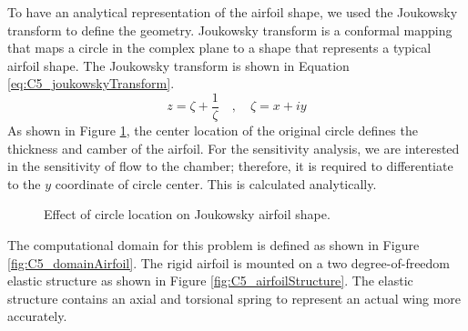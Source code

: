To have an analytical representation of the airfoil shape, we used the Joukowsky transform to define the geometry. Joukowsky transform is a conformal mapping that maps a circle in the complex plane to a shape that represents a typical airfoil shape. The Joukowsky transform is shown in Equation \eqref{eq:C5_joukowskyTransform}.
%
\begin{equation}\label{eq:C5_joukowskyTransform}
	z = \zeta + \frac{1}{\zeta} \quad , \quad \zeta = x + iy
\end{equation}
%
As shown in Figure \ref{fig:C5_joukowskyAirfoil}, the center location of the original circle defines the thickness and camber of the airfoil. For the sensitivity analysis, we are interested in the sensitivity of flow to the chamber; therefore, it is required to differentiate to the $y$ coordinate of circle center. This is calculated analytically.
%
\begin{figure}[H]
    \centering
    \quad
    \quad
    \caption{Effect of circle location on Joukowsky airfoil shape.}
    \label{fig:C5_joukowskyAirfoil}
\end{figure}
%
The computational domain for this problem is defined as shown in Figure \ref{fig:C5_domainAirfoil}. The rigid airfoil is mounted on a two degree-of-freedom elastic structure as shown in Figure \ref{fig:C5_airfoilStructure}. The elastic structure contains an axial and torsional spring to represent an actual wing more accurately.
